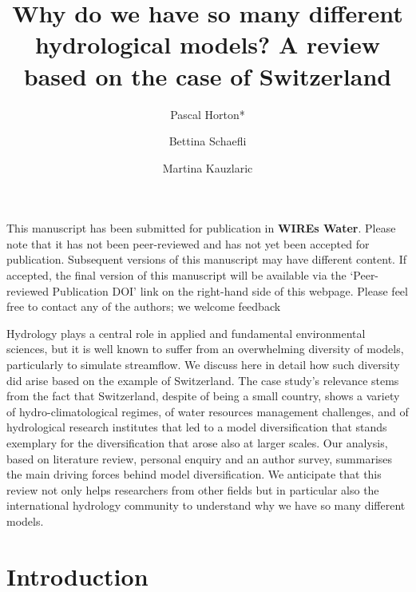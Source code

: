 \documentclass[10pt,a4paper]{article}
\renewenvironment{abstract}
 {{\bfseries\noindent{\abstractname}\par\nobreak}\footnotesize}
 {\bigskip}
\begin{document}
\title{Why do we have so many different hydrological models? A review based on the case of Switzerland}


\author[1]{Pascal Horton*}
\author[1]{Bettina Schaefli}
\author[1]{Martina Kauzlaric}


\date{}


\ifdefined\preprint
\setcounter{page}{0}
\hrulefill

This manuscript has been submitted for publication in \textbf{WIREs Water}. Please note that it has not been peer-reviewed and has not yet been accepted for publication. Subsequent versions of this manuscript may have different content. If accepted, the final version of this manuscript will be available via the ‘Peer-reviewed Publication DOI' link on the right-hand side of this webpage. Please feel free to contact any of the authors; we welcome feedback

\hrulefill
\newpage
\fi

\begingroup
\maketitle
\endgroup




\begin{abstract}
Hydrology plays a central role in applied and fundamental environmental sciences, but it is well known to suffer from an overwhelming diversity of models, particularly to simulate streamflow. We discuss here in detail how such diversity did arise based on the example of Switzerland. The case study's relevance stems from the fact that Switzerland, despite of being a small country, shows a variety of hydro-climatological regimes, of water resources management challenges, and of hydrological research institutes that led to a model diversification that stands exemplary for the diversification that arose also at larger scales. Our analysis, based on literature review, personal enquiry and an author survey, summarises the main driving forces behind model diversification. We anticipate that this review not only helps researchers from other fields but in particular also the international hydrology community to understand why we have so many different models.
\end{abstract}


\section{Introduction}
\label{sec:intro}
\end{document}
